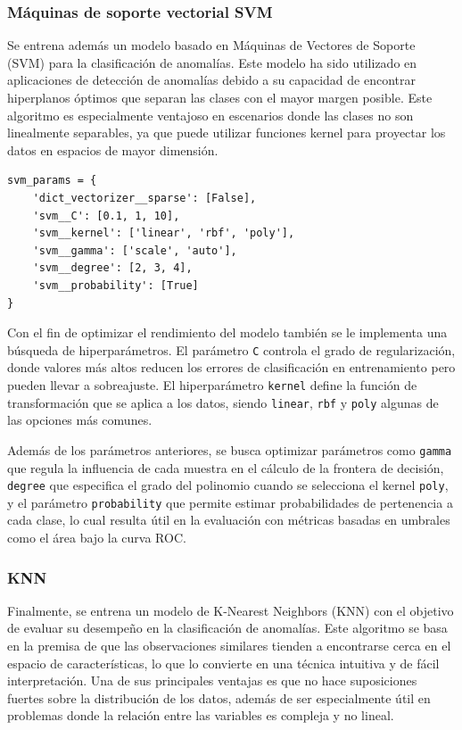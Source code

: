 \documentclass[11pt,a4paper,spanish]{book}
\numberwithin{equation}{chapter}
\numberwithin{figure}{chapter}
\begin{document}
\subsubsection{Máquinas de soporte vectorial SVM}

Se entrena además un modelo basado en Máquinas de Vectores de Soporte (SVM) para la 
clasificación de anomalías. Este modelo ha sido utilizado en aplicaciones de detección 
de anomalías debido a su capacidad de encontrar hiperplanos óptimos que separan las 
clases con el mayor margen posible. Este algoritmo es especialmente ventajoso en 
escenarios donde las clases no son linealmente separables, ya que puede utilizar 
funciones kernel para proyectar los datos en espacios de mayor dimensión. 


\vspace{5mm}
\begin{lstlisting}
svm_params = {
    'dict_vectorizer__sparse': [False],
    'svm__C': [0.1, 1, 10],                  
    'svm__kernel': ['linear', 'rbf', 'poly'],
    'svm__gamma': ['scale', 'auto'],         
    'svm__degree': [2, 3, 4],                
    'svm__probability': [True]               
}
\end{lstlisting}


Con el fin de optimizar el rendimiento del modelo también se le implementa una búsqueda 
de hiperparámetros. El parámetro \lstinline|C| controla el grado de regularización, 
donde valores más altos reducen los errores de clasificación en entrenamiento pero 
pueden llevar a sobreajuste. El hiperparámetro \lstinline|kernel| define la función de 
transformación que se aplica a los datos, siendo \lstinline|linear|, \lstinline|rbf| y 
\lstinline|poly| algunas de las opciones más comunes. 


Además de los parámetros anteriores, se busca optimizar parámetros como 
\lstinline|gamma| que regula la influencia de cada muestra en el cálculo de la frontera 
de decisión, \lstinline|degree| que especifica el grado del polinomio cuando se 
selecciona el kernel \lstinline|poly|, y el parámetro \lstinline|probability| que 
permite estimar probabilidades de pertenencia a cada clase, lo cual resulta útil en la 
evaluación con métricas basadas en umbrales como el área bajo la curva ROC. 


\subsubsection{KNN}


Finalmente, se entrena un modelo de K-Nearest Neighbors (KNN) con el objetivo de 
evaluar su desempeño en la clasificación de anomalías. 
Este algoritmo se basa en la premisa de que las observaciones similares tienden a 
encontrarse cerca en el espacio de características, lo que lo convierte en una técnica 
intuitiva y de fácil interpretación. Una de sus principales ventajas es que no hace 
suposiciones fuertes sobre la distribución de los datos, además de ser especialmente 
útil en problemas donde la relación entre las variables es compleja y no lineal.
\end{document}
